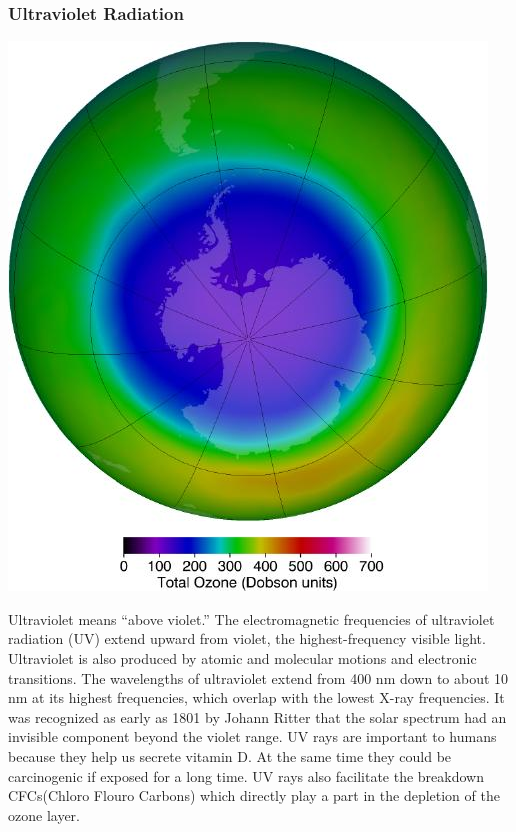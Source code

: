 \documentclass[11pt]{article}
\begin{document}
\subsubsection*{Ultraviolet Radiation}
\begin{center}
	\includegraphics[scale=0.3]{uv}
\end{center}
Ultraviolet means “above violet.” The electromagnetic frequencies of ultraviolet radiation (UV) extend upward from violet, the highest-frequency visible light. Ultraviolet is also produced by atomic and molecular motions and electronic transitions. The wavelengths of ultraviolet extend from 400 nm down to about 10 nm at its highest frequencies, which overlap with the lowest X-ray frequencies. It was recognized as early as 1801 by Johann Ritter that the solar spectrum had an invisible component beyond the violet range. UV rays are important to humans because they help us secrete vitamin D. At the same time they could be carcinogenic if exposed for a long time. UV rays also facilitate the breakdown CFCs(Chloro Flouro Carbons) which directly play a part in the depletion of the ozone layer.
\end{document}
